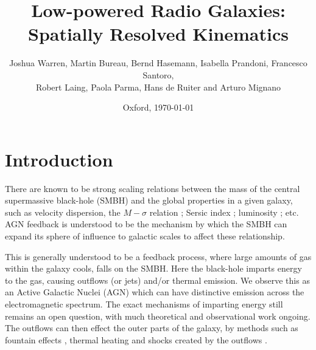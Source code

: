\documentclass[a4paper,fleqn,usenatbib,useAMS]{mnras}
\begin{document}
\title{Low-powered Radio Galaxies: Spatially Resolved Kinematics}
\author{Joshua Warren, Martin Bureau, Bernd Hasemann, Isabella Prandoni, Francesco Santoro,\\ Robert Laing, Paola Parma, Hans de Ruiter and Arturo Mignano}
\date{Oxford, \today}


\maketitle


\section{Introduction}
	\label{sec:intro}
	There are known to be strong scaling relations between the mass of the central supermassive black-hole (SMBH) and the global properties in a given galaxy, such as velocity dispersion, the $M-\sigma$ relation \citep{Ferrarese2000, Gebhardt2000, Graham2011}; Sersic index \citep{Graham2007, Savorgnan2013}; luminosity \citep{Laor2001, McLure2001, Lauer2007, Graham2012}; etc. AGN feedback is understood to be the mechanism by which the SMBH can expand its sphere of influence to galactic scales to affect these relationship. 

	This is generally understood to be a feedback process, where large amounts of gas within the galaxy cools, falls on the SMBH. Here the black-hole imparts energy to the gas, causing outflows (or jets) and/or thermal emission. We observe this as an Active Galactic Nuclei (AGN) which can have distinctive emission across the electromagnetic spectrum. The exact mechanisms of imparting energy still remains an open question, with much theoretical and observational work ongoing. The outflows can then effect the outer parts of the galaxy, by methods such as fountain effects \citep{}, thermal heating \citep{DeYoung2010} and shocks created by the outflows \citep{}.
\end{document}
